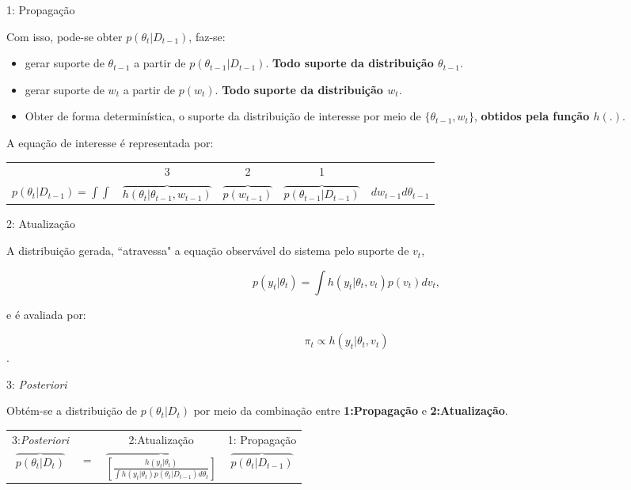 \documentclass{beamer}
\begin{document}
\begin{frame}{1: Propagação}


Com isso, pode-se obter $p(\theta_t|D_{t-1})$, faz-se:
\pause
\begin{itemize}
\item[1-] gerar suporte de  $\theta_{t-1}$ a partir de $p(\theta_{t-1}|D_{t-1})$. \textbf{Todo suporte da distribuição $\theta_{t-1}$}.

\pause


\item[2-] gerar suporte de $w_{t}$ a partir de $p(w_{t})$. \textbf{Todo suporte da distribuição $w_{t}$}.

\pause

\item[3-]  Obter de forma determinística, o suporte da distribuição de interesse por meio de $\{\theta_{t-1},w_{t}\}$,  \textbf{obtidos pela função $h(.)$}.
\end{itemize}

\pause


A equação de interesse é representada por:
\begin{small}

\begin{tabular}{ccccc}
 & 3 & 2 & 1 & \\
$p(\theta_t|D_{t-1}) = \int \int $& $\overbrace{h(\theta_t|\theta_{t-1},w_{t-1})} $& $\overbrace{p(w_{t-1})} $& $\overbrace{p(\theta_{t-1}|D_{t-1})} $&$ dw_{t-1}d\theta_{t-1}$
\end{tabular}

\end{small}

\end{frame}



\begin{frame}{2: Atualização}

A distribuição gerada, ``atravessa" a equação observável do sistema pelo suporte de $v_t$,

$$
p(y_t|\theta_{t}) = \int h(y_t|\theta_{t},v_{t})p(v_{t})dv_{t},
$$
\pause

e é avaliada por:

$$ \pi_t \propto h(y_t|\theta_t, v_{t})$$.


\end{frame}

\begin{frame}{3: \textit{Posteriori}}


Obtém-se a distribuição de $p(\theta_{t}|D_t)$ por meio da combinação entre \textbf{1:Propagação} e  \textbf{2:Atualização}.

\vspace{0.5cm}

\pause

\begin{tabular}{cccc}
3:\textit{Posteriori} & & 2:Atualização & 1: Propagação \\
$\overbrace{p(\theta_t|D_t)} $ & $=$ & $\overbrace{\left[\frac{h(y_t|\theta_t)}{\int h(y_t|\theta_t)p(\theta_t|D_{t-1})d \theta_t}\right]} $& $\overbrace{p(\theta_t|D_{t-1})}$
\end{tabular}


\end{frame}
\end{document}
